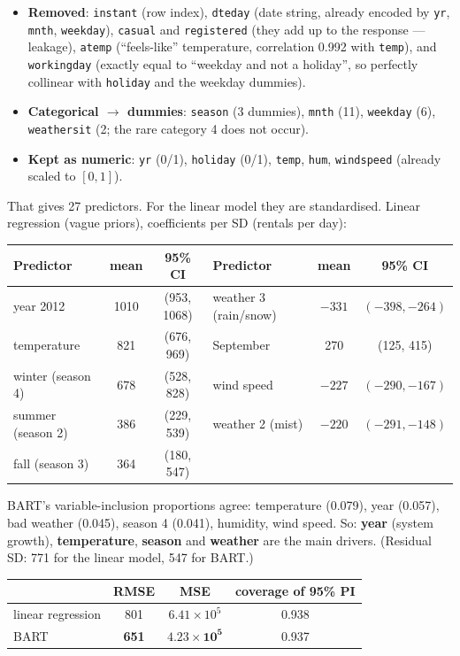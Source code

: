 \documentclass[11pt]{article}
\begin{document}
\solution
{}
\begin{itemize}
\item \textbf{Removed}: \texttt{instant} (row index), \texttt{dteday} (date string, already encoded by \texttt{yr}, \texttt{mnth}, \texttt{weekday}), \texttt{casual} and \texttt{registered} (they add up to the response --- leakage), \texttt{atemp} (``feels-like'' temperature, correlation 0.992 with \texttt{temp}), and \texttt{workingday} (exactly equal to ``weekday and not a holiday'', so perfectly collinear with \texttt{holiday} and the weekday dummies).
\item \textbf{Categorical $\to$ dummies}: \texttt{season} (3 dummies), \texttt{mnth} (11), \texttt{weekday} (6), \texttt{weathersit} (2; the rare category 4 does not occur).
\item \textbf{Kept as numeric}: \texttt{yr} (0/1), \texttt{holiday} (0/1), \texttt{temp}, \texttt{hum}, \texttt{windspeed} (already scaled to $[0,1]$).
\end{itemize}
That gives 27 predictors. For the linear model they are standardised.
 Linear regression (vague priors), coefficients per SD (rentals per day):
\begin{center}
\small
\begin{tabular}{lcc|lcc}\toprule
Predictor & mean & 95\% CI & Predictor & mean & 95\% CI\\\midrule
year 2012 & 1010 & (953, 1068) & weather 3 (rain/snow) & $-331$ & $(-398,-264)$\\
temperature & 821 & (676, 969) & September & 270 & (125, 415)\\
winter (season 4) & 678 & (528, 828) & wind speed & $-227$ & $(-290,-167)$\\
summer (season 2) & 386 & (229, 539) & weather 2 (mist) & $-220$ & $(-291,-148)$\\
fall (season 3) & 364 & (180, 547) & & & \\\bottomrule
\end{tabular}
\end{center}
BART's variable-inclusion proportions agree: temperature (0.079), year (0.057), bad weather (0.045), season 4 (0.041), humidity, wind speed. So: \textbf{year} (system growth), \textbf{temperature}, \textbf{season} and \textbf{weather} are the main drivers. (Residual SD: 771 for the linear model, 547 for BART.)
\begin{center}
\begin{tabular}{lccc}\toprule
 & RMSE & MSE & coverage of 95\% PI\\\midrule
linear regression & 801 & $6.41\times10^5$ & 0.938\\
BART & \textbf{651} & $\mathbf{4.23\times10^5}$ & 0.937\\\bottomrule
\end{tabular}
\end{center}
\end{document}
